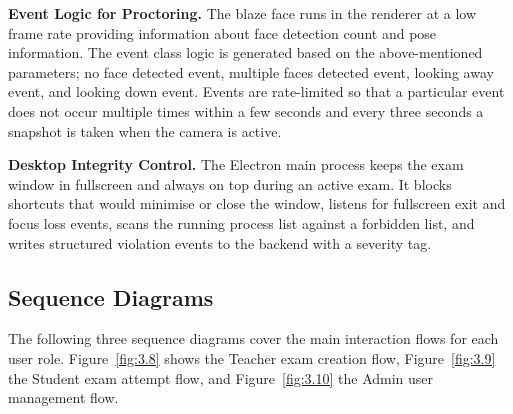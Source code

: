 \documentclass[12pt, a4paper]{report}
\begin{document}
\begin{justify}
{    \textbf{Event Logic for Proctoring.} The blaze face runs in the renderer at a low frame rate providing information about face detection count and pose information. The event class logic is generated based on the above-mentioned parameters; no face detected event, multiple faces detected event, looking away event, and looking down event. Events are rate-limited so that a particular event does not occur multiple times within a few seconds and every three seconds a snapshot is taken when the camera is active.

    \textbf{Desktop Integrity Control.} The Electron main process keeps the exam window in fullscreen and always on top during an active exam. It blocks shortcuts that would minimise or close the window, listens for fullscreen exit and focus loss events, scans the running process list against a forbidden list, and writes structured violation events to the backend with a severity tag.
  }
\end{justify}

\subsection{Sequence Diagrams}

\begin{justify}
  {\fontsize{12}{18}\selectfont
    The following three sequence diagrams cover the main interaction flows for each user role. Figure~\ref{fig:3.8} shows the Teacher exam creation flow, Figure~\ref{fig:3.9} the Student exam attempt flow, and Figure~\ref{fig:3.10} the Admin user management flow.
  }
\end{justify}
\end{document}
